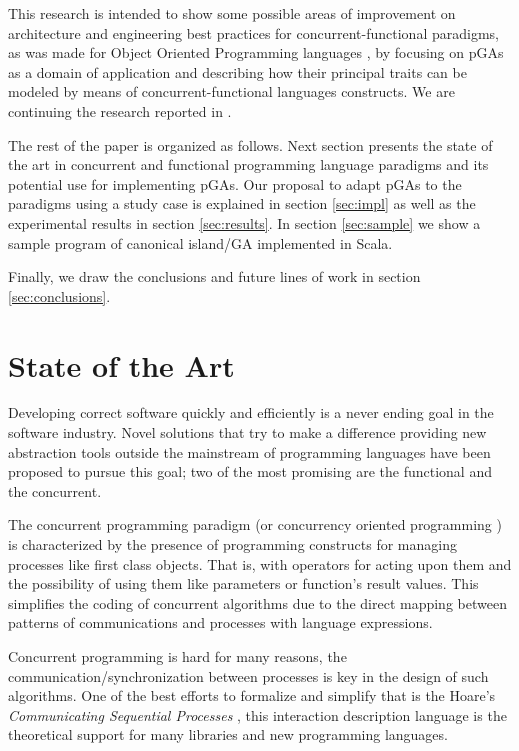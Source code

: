 \documentclass[sigconf]{acmart}
\begin{document}
This research is intended to show some possible areas of improvement on architecture and engineering best practices for concurrent-functional paradigms, as was made for Object Oriented Programming languages \cite{EO:FEA2000}, by focusing on pGAs as a domain of application and describing how their principal traits can be modeled by means of concurrent-functional languages constructs. We are continuing the research reported in \cite{DBLP:conf/gecco/CruzGGC13,J.Albert-Cruz2013}.

The rest of the paper is organized as follows. Next section presents the state of the art in concurrent and functional programming language paradigms and its potential use for implementing pGAs. Our proposal to adapt pGAs to the paradigms using a study case is explained in section \ref{sec:impl} as well as the experimental results in section \ref{sec:results}. In section \ref{sec:sample} we show a sample program of canonical island/GA implemented in Scala.

Finally, we draw the conclusions and future lines of work in section \ref{sec:conclusions}.


\section{State of the Art}
\noindent Developing correct software quickly and efficiently is a
never ending goal in the software industry. Novel solutions that try
to make a difference providing new abstraction tools outside the
mainstream of programming languages have been proposed to pursue this
goal; two of the most promising are the functional and the concurrent.

The concurrent programming paradigm (or concurrency oriented
programming \cite{Armstrong2003}) is characterized by the presence of
programming constructs for managing processes like first class
objects. That is, with operators for acting upon them and the
possibility of using them like parameters or function's result
values. This simplifies the coding of concurrent algorithms due to the
direct mapping between patterns of communications and processes with
language expressions. 

Concurrent programming is hard for many reasons, the communication/synchronization between processes is key in the design of such algorithms. One of the best efforts to formalize and simplify that is the Hoare’s {\em Communicating Sequential Processes} \cite{Hoare:1978:CSP:359576.359585}, this interaction description language is the theoretical support for many libraries and new programming languages.
\end{document}
